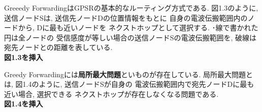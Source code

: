Greeedy ForwardingはGPSRの基本的なルーティング方式である.
図1.3のように, 送信ノードSは, 送信先ノードDの位置情報をもとに
自身の電波伝搬範囲内のノードから, Dに最も近いノードを
ネクストホップとして選択する. ･線で書かれた円は全ノードの
受信感度が等しい場合の送信ノードSの電波伝搬範囲を, 
破線は宛先ノードとの距離を表している.\\

\textbf{図1.3を挿入}

Greedy Forwardingには\textbf{局所最大問題}といものが存在している. 
局所最大問題とは, 図1.4のように, 送信ノードSが自身の
電波伝搬範囲内で宛先ノードDに最も近い場合, 選択できる
ネクストホップが存在しなくなる問題である.\\

\textbf{図1.4を挿入}
